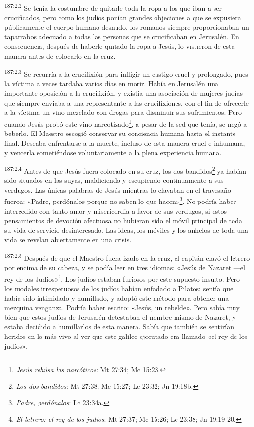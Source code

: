 \par
\textsuperscript{187:2.2} Se tenía la costumbre de quitarle toda la ropa a los que iban a ser crucificados, pero como los judíos ponían grandes objeciones a que se expusiera públicamente el cuerpo humano desnudo, los romanos siempre proporcionaban un taparrabos adecuado a todas las personas que se crucificaban en Jerusalén. En consecuencia, después de haberle quitado la ropa a Jesús, lo vistieron de esta manera antes de colocarlo en la cruz.

\par
\textsuperscript{187:2.3} Se recurría a la crucifixión para infligir un castigo cruel y prolongado, pues la víctima a veces tardaba varios días en morir. Había en Jerusalén una importante oposición a la crucifixión, y existía una asociación de mujeres judías que siempre enviaba a una representante a las crucifixiones, con el fin de ofrecerle a la víctima un vino mezclado con drogas para disminuir sus sufrimientos. Pero cuando Jesús probó este vino narcotizado\footnote{\textit{Jesús rehúsa los narcóticos}: Mt 27:34; Mc 15:23.}, a pesar de la sed que tenía, se negó a beberlo. El Maestro escogió conservar su conciencia humana hasta el instante final. Deseaba enfrentarse a la muerte, incluso de esta manera cruel e inhumana, y vencerla sometiéndose voluntariamente a la plena experiencia humana.

\par
\textsuperscript{187:2.4} Antes de que Jesús fuera colocado en su cruz, los dos bandidos\footnote{\textit{Los dos bandidos}: Mt 27:38; Mc 15:27; Lc 23:32; Jn 19:18b.} ya habían sido situados en las suyas, maldiciendo y escupiendo continuamente a sus verdugos. Las únicas palabras de Jesús mientras lo clavaban en el travesaño fueron: «Padre, perdónalos porque no saben lo que hacen»\footnote{\textit{Padre, perdónalos}: Lc 23:34a.}. No podría haber intercedido con tanto amor y misericordia a favor de sus verdugos, si estos pensamientos de devoción afectuosa no hubieran sido el móvil principal de toda su vida de servicio desinteresado. Las ideas, los móviles y los anhelos de toda una vida se revelan abiertamente en una crisis.

\par
\textsuperscript{187:2.5} Después de que el Maestro fuera izado en la cruz, el capitán clavó el letrero por encima de su cabeza, y se podía leer en tres idiomas: «Jesús de Nazaret ---el rey de los Judíos»\footnote{\textit{El letrero: el rey de los judíos}: Mt 27:37; Mc 15:26; Lc 23:38; Jn 19:19-20.}. Los judíos estaban furiosos por este supuesto insulto. Pero los modales irrespetuosos de los judíos habían enfadado a Pilatos; sentía que había sido intimidado y humillado, y adoptó este método para obtener una mezquina venganza. Podría haber escrito: «Jesús, un rebelde». Pero sabía muy bien que estos judíos de Jerusalén detestaban el nombre mismo de Nazaret, y estaba decidido a humillarlos de esta manera. Sabía que también se sentirían heridos en lo más vivo al ver que este galileo ejecutado era llamado «el rey de los judíos».


